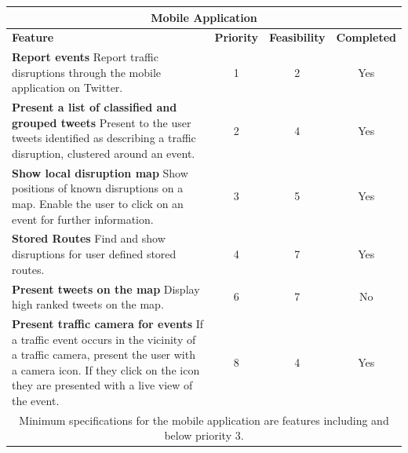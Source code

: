 \begin{center}
\begin{tabular}{ | p{8.5cm} | c | c | c | }
\hline
\multicolumn{4}{|c|}{\textbf{Mobile Application}} \\ \hline
\textbf{Feature} & \textbf{Priority} & \textbf{Feasibility} & \textbf{Completed} \\ \hline
\textbf{Report events}\newline
Report traffic disruptions through the mobile application on Twitter. & 1 & 2 & Yes \\ \hline

\textbf{Present a list of classified and grouped tweets}\newline
Present to the user tweets identified as describing a traffic disruption,
clustered around an event. & 2 & 4 & Yes \\ \hline

\textbf{Show local disruption map}\newline
Show positions of known disruptions on a map. Enable the user to click on an
event for further information. & 3 & 5 & Yes \\ \hline \hline

\textbf{Stored Routes}\newline
Find and show disruptions for user defined stored routes. & 4 & 7 & Yes \\ \hline 

\textbf{Present tweets on the map}\newline 
Display high ranked tweets on the map.& 6 & 7 & No \\ \hline 

\textbf{Present traffic camera for events}\newline
If a traffic event occurs in the vicinity of a traffic camera, present the user
with a camera icon. If they click on the icon they are presented with a live
view of the event. &  8 & 4 & Yes \\ \hline

\multicolumn{4}{|c|}{Minimum specifications for the mobile application are
features including and below priority 3.} \\ \hline
\end{tabular}
\end{center}
